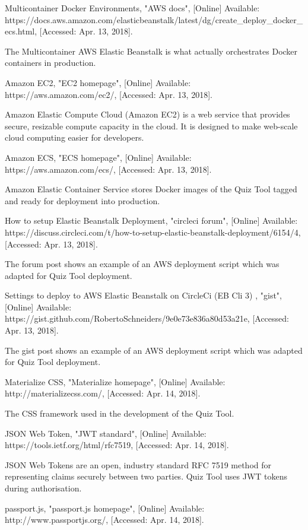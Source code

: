 \documentclass[11pt,a4paper]{report}
\begin{document}
\begin{thebibliography}{1}
 Multicontainer Docker Environments, "AWS docs", [Online] Available: https://docs.aws.amazon.com/elasticbeanstalk/latest/dg/create\_deploy\_docker\_ecs.html, [Accessed: Apr. 13, 2018].

    The Multicontainer AWS Elastic Beanstalk is what actually orchestrates Docker containers in production.

 Amazon EC2, "EC2 homepage", [Online] Available: https://aws.amazon.com/ec2/, [Accessed: Apr. 13, 2018].

    Amazon Elastic Compute Cloud (Amazon EC2) is a web service that provides secure, resizable compute capacity in the cloud. It is designed to make web-scale cloud computing easier for developers.

 Amazon ECS, "ECS homepage", [Online] Available: https://aws.amazon.com/ecs/, [Accessed: Apr. 13, 2018].

    Amazon Elastic Container Service stores Docker images of the Quiz Tool tagged and ready for deployment into production.

 How to setup Elastic Beanstalk Deployment, "circleci forum", [Online] Available: https://discuss.circleci.com/t/how-to-setup-elastic-beanstalk-deployment/6154/4, [Accessed: Apr. 13, 2018].

    The forum post shows an example of an AWS deployment script which was adapted for Quiz Tool deployment.

 Settings to deploy to AWS Elastic Beanstalk on CircleCi (EB Cli 3) , "gist", [Online] Available: https://gist.github.com/RobertoSchneiders/9e0e73e836a80d53a21e, [Accessed: Apr. 13, 2018].

    The gist post shows an example of an AWS deployment script which was adapted for Quiz Tool deployment.

 Materialize CSS, "Materialize homepage", [Online] Available: http://materializecss.com/, [Accessed: Apr. 14, 2018].

    The CSS framework used in the development of the Quiz Tool.

 JSON Web Token, "JWT standard", [Online] Available: https://tools.ietf.org/html/rfc7519, [Accessed: Apr. 14, 2018].

  JSON Web Tokens are an open, industry standard RFC 7519 method for representing claims securely between two parties. Quiz Tool
  uses JWT tokens during authorisation.

 passport.js, "passport.js homepage", [Online] Available: http://www.passportjs.org/, [Accessed: Apr. 14, 2018].


\end{thebibliography}
\end{document}
